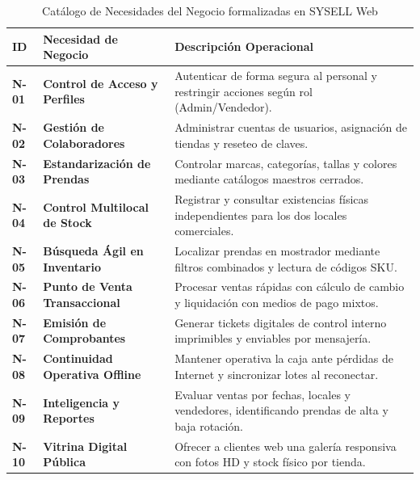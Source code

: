 \begin{table}[H]
\centering
\small
\begin{tabularx}{\textwidth}{>{\bfseries\centering}p{1.2cm} >{\bfseries}p{4.2cm} Y}
\toprule
\textbf{ID} & \textbf{Necesidad de Negocio} & \textbf{Descripción Operacional} \\
\midrule
N-01 & Control de Acceso y Perfiles & Autenticar de forma segura al personal y restringir acciones según rol (Admin/Vendedor). \\
N-02 & Gestión de Colaboradores & Administrar cuentas de usuarios, asignación de tiendas y reseteo de claves. \\
N-03 & Estandarización de Prendas & Controlar marcas, categorías, tallas y colores mediante catálogos maestros cerrados. \\
N-04 & Control Multilocal de Stock & Registrar y consultar existencias físicas independientes para los dos locales comerciales. \\
N-05 & Búsqueda Ágil en Inventario & Localizar prendas en mostrador mediante filtros combinados y lectura de códigos SKU. \\
N-06 & Punto de Venta Transaccional & Procesar ventas rápidas con cálculo de cambio y liquidación con medios de pago mixtos. \\
N-07 & Emisión de Comprobantes & Generar tickets digitales de control interno imprimibles y enviables por mensajería. \\
N-08 & Continuidad Operativa Offline & Mantener operativa la caja ante pérdidas de Internet y sincronizar lotes al reconectar. \\
N-09 & Inteligencia y Reportes & Evaluar ventas por fechas, locales y vendedores, identificando prendas de alta y baja rotación. \\
N-10 & Vitrina Digital Pública & Ofrecer a clientes web una galería responsiva con fotos HD y stock físico por tienda. \\
\bottomrule
\end{tabularx}
\caption{Catálogo de Necesidades del Negocio formalizadas en SYSELL Web}
\label{tab:necesidades_negocio}
\end{table}

